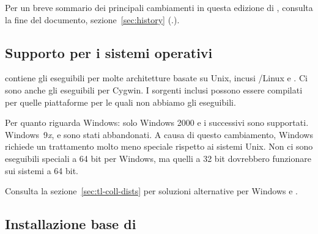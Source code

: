 \documentclass{article}
\begin{document}
Per un breve sommario dei principali cambiamenti in questa edizione
di \TL, consulta la fine del documento, sezione~\ref{sec:history}
(\p.\pageref{sec:history}).

\subsection{Supporto per i sistemi operativi}
\label{sec:os-support}

\TL{} contiene gli eseguibili per molte architetture basate su Unix,
incusi \GNU/Linux e \MacOSX. Ci sono anche gli eseguibili per Cygwin.
I sorgenti inclusi possono essere compilati per quelle piattaforme
per le quali non abbiamo gli eseguibili.

Per quanto riguarda Windows: solo Windows 2000 e i successivi sono
supportati. Windows~9\textit{x},  e  sono stati
abbandonati. A causa di questo cambiamento, Windows richiede un
trattamento molto meno speciale rispetto ai sistemi Unix. Non ci
sono eseguibili speciali a 64 bit per Windows, ma quelli a 32 bit
dovrebbero funzionare sui sistemi a 64 bit.

Consulta la sezione~\ref{sec:tl-coll-dists} per soluzioni alternative
per Windows e \MacOSX.

\subsection{Installazione base di \protect\TL{}}
\label{sec:basic}
\end{document}
